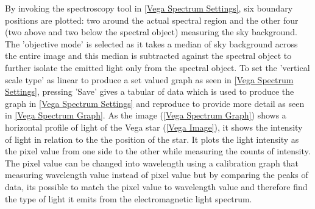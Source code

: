 \documentclass[12pt]{article}
\begin{document}
By invoking the spectroscopy tool in \cref{Vega Spectrum Settings}, six boundary positions are plotted: two around the actual spectral region and the other four (two above and two below the spectral object) measuring the sky background. The 'objective mode' is selected as it takes a median of sky background across the entire image and this median is subtracted against the spectral object to further isolate the emitted light only from the spectral object. To set the 'vertical scale type' as linear to produce a set valued graph as seen in \cref{Vega Spectrum Settings}, pressing 'Save' gives a tabular of data which is used to produce the graph in \cref{Vega Spectrum Settings} and reproduce to provide more detail as seen in \cref{Vega Spectrum Graph}. As the image (\cref{Vega Spectrum Graph}) shows a horizontal profile of light of the Vega star (\cref{Vega Image}), it shows the intensity of light in relation to the the position of the star. It plots the light intensity as the pixel value from one side to the other while measuring the counts of intensity. The pixel value can be changed into wavelength using a calibration graph that measuring wavelength value instead of pixel value but by comparing  the peaks of data, its possible to match the pixel value to wavelength value and therefore find the type of light it emits from the electromagnetic light spectrum.
\end{document}
